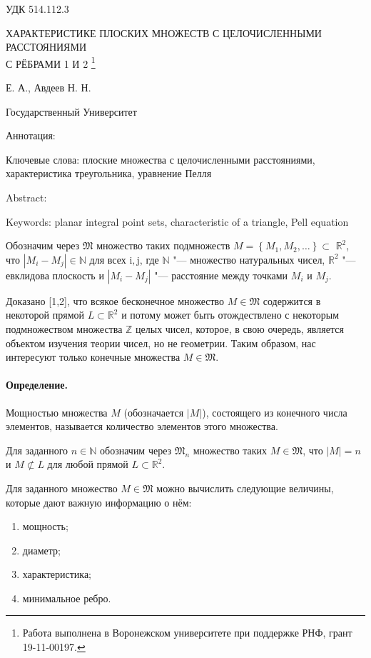 \documentclass[a4paper,openbib]{article}
\begin{document}
\noindent УДК 514.112.3


\begin{center}
	 ХАРАКТЕРИСТИКЕ ПЛОСКИХ МНОЖЕСТВ С ЦЕЛОЧИСЛЕННЫМИ РАССТОЯНИЯМИ\\С РЁБРАМИ 1 И 2
	\footnote{
		Работа выполнена в Воронежском университете при поддержке РНФ, грант 19-11-00197.
	}

	 Е. А., Авдеев Н. Н.

	 Государственный Университет
\end{center}

Аннотация:

Ключевые слова:
	плоские множества с целочисленными расстояниями,
	характеристика треугольника,
	уравнение Пелля

Abstract:

Keywords:
	planar integral point sets,
	characteristic of a triangle,
	Pell equation




Обозначим через $\mathfrak{M}$ множество таких подмножеств $M=\left\{M_{1}, M_{2}, \ldots\right\} \subset$ $\mathbb{R}^{2}$,
что $\left|M_{i}-M_{j}\right| \in \mathbb{N}$ для всех $\mathrm{i}, \mathrm{j}$,
где $\mathbb{N}$ "--- множество натуральных чисел,
$\mathbb{R}^2$ "--- евклидова плоскость
и $\left|M_{i}-M_{j}\right|$ "--- расстояние между точками $M_{i}$ и $M_{j}$.




Доказано [1,2], что всякое бесконечное множество $M \in \mathfrak{M}$ содержится в некоторой прямой $L \subset \mathbb{R}^{2}$
и потому может быть отождествлено с некоторым подмножеством множества $\mathbb{Z}$ целых чисел,
которое, в свою очередь, является объектом изучения теории чисел, но не геометрии.
Таким образом, нас интересуют только конечные множества $M \in \mathfrak{M}$.

\paragraph{Определение.}
Мощностью множества $M$ (обозначается $|M|$), состоящего из конечного
числа элементов, называется количество элементов этого множества.

Для заданного $n \in \mathbb{N}$ обозначим через $\mathfrak{M}_{n}$ множество таких $M \in \mathfrak{M}$,
что $|M|=n$ и $M \not \subset L$ для любой прямой $L \subset \mathbb{R}^{2}$.

Для заданного множество $M \in \mathfrak{M}$ можно вычислить следующие величины,
которые дают важную информацию о нём:
\begin{enumerate}
	\item
		мощность;
	\item
		диаметр;
	\item
		характеристика;
	\item
		минимальное ребро.
\end{enumerate}
\end{document}
